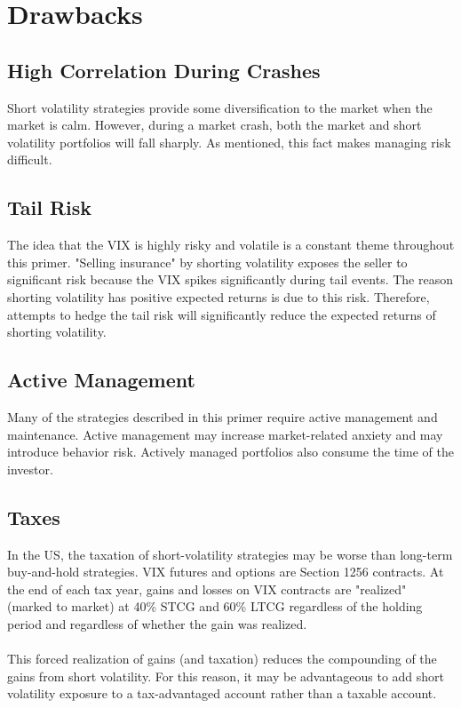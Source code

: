 \documentclass[11pt, oneside]{book}
\begin{document}
\section{Drawbacks} \label{Conclusion-Drawback}
\subsection{High Correlation During Crashes} \label{Conclusion-Drawback-Correlation}
Short volatility strategies provide some diversification to the market when the market is calm. However, during a market crash, both the market and short volatility portfolios will fall sharply. As mentioned, this fact makes managing risk difficult. 

\subsection{Tail Risk} \label{Conclusion-Drawback-TailRisk}
The idea that the VIX is highly risky and volatile is a constant theme throughout this primer. "Selling insurance" by shorting volatility exposes the seller to significant risk because the VIX spikes significantly during tail events. The reason shorting volatility has positive expected returns is due to this risk. Therefore, attempts to hedge the tail risk will significantly reduce the expected returns of shorting volatility. 

\subsection{Active Management} \label{Conclusion-Drawback-Management}
Many of the strategies described in this primer require active management and maintenance. Active management may increase market-related anxiety and may introduce behavior risk. Actively managed portfolios also consume the time of the investor.

\subsection{Taxes} \label{Conclusion-Drawback-Taxes}
In the US, the taxation of short-volatility strategies may be worse than long-term buy-and-hold strategies. VIX futures and options are Section 1256 contracts. At the end of each tax year, gains and losses on VIX contracts are "realized" (marked to market) at 40\% STCG and 60\% LTCG regardless of the holding period and regardless of whether the gain was realized.\\
\\
This forced realization of gains (and taxation) reduces the compounding of the gains from short volatility. For this reason, it may be advantageous to add short volatility exposure to a tax-advantaged account rather than a taxable account.
\end{document}
